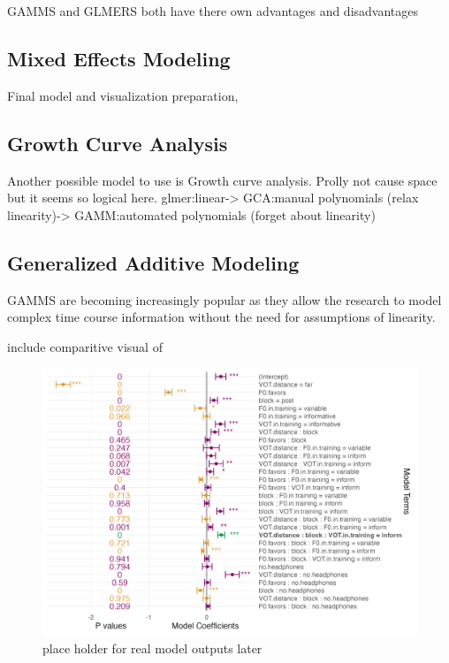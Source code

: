 GAMMS and GLMERS both have there own advantages and disadvantages \parencite{Ito_Knoeferle_2022}

\subsection{Mixed Effects Modeling}
Final model and visualization preparation, 





\subsection{Growth Curve Analysis}

Another possible model to use is Growth curve analysis. Prolly not cause space but it seems so logical here. glmer:linear-> GCA:manual polynomials (relax linearity)-> GAMM:automated polynomials (forget about linearity)


\subsection{Generalized Additive Modeling}



GAMMS are becoming increasingly popular as they allow the research to model complex time course information without the need for assumptions of linearity.

include comparitive visual of 
\begin{figure}[h]
    \centering
    \includegraphics[width=\textwidth]{figures/model_outputs}
    \caption{place holder for real model outputs later}
    \label{fig:model_outputs}
\end{figure}